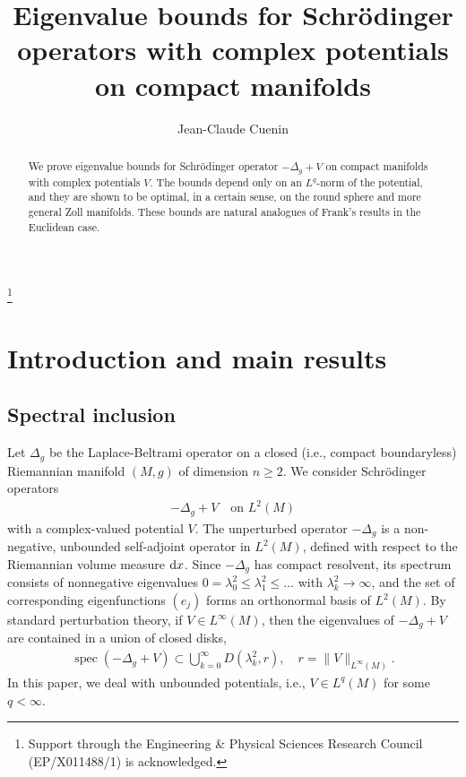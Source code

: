 \documentclass[12pt]{amsart}
\newcommand{\rd}{{\rm d}}
\DeclareMathOperator{\spec}{spec}
\begin{document}
\title[Eigenvalue bounds on compact manifolds]{Eigenvalue bounds for {S}chr\"{o}dinger operators with complex potentials on compact manifolds}

 \author{Jean-Claude Cuenin}
 \address{Department of Mathematical Sciences, Loughborough University, Loughborough,
 Leicestershire, LE11 3TU United Kingdom}
 
 \date{}
 \thanks{Support through the Engineering \& Physical Sciences Research Council (EP/X011488/1) is acknowledged.}

\begin{abstract}
We prove eigenvalue bounds for Schr\"odinger operator $-\Delta_g+V$ on compact manifolds with complex potentials $V$. The bounds depend only on an $L^q$-norm of the potential, and they are shown to be optimal, in a certain sense, on the round sphere and more general Zoll manifolds. These bounds are natural analogues of Frank's \cite{MR2820160} results in the Euclidean case.
\end{abstract}
\maketitle




\section{Introduction and main results}
\subsection{Spectral inclusion} Let $\Delta_g$ be the Laplace-Beltrami operator on a closed (i.e., compact boundaryless) Riemannian manifold $(M,g)$ of dimension $n\geq 2$.
We consider Schrödinger operators 
\begin{align}\label{Schrödinger operator on M}
    -\Delta_g+V \quad \mbox{on } L^2(M)
\end{align}
 with a complex-valued potential $V$. The unperturbed operator $-\Delta_g$ is a 
non-negative, unbounded self-adjoint operator in $L^2(M)$, defined with respect to the Riemannian volume measure $\rd x$. Since $-\Delta_g$ has compact resolvent, its spectrum consists of nonnegative eigenvalues $0=\lambda_0^2\leq \lambda_1^2\leq \ldots$ with $\lambda_k^2\to\infty$, and the set of corresponding eigenfunctions $(e_j)$ forms an orthonormal basis of $L^2(M)$. 
By standard perturbation theory, if $V\in L^{\infty}(M)$, then the eigenvalues of $-\Delta_g+V$ are contained in a union of closed disks, 
\begin{align}\label{Linfty bound}
\spec(-\Delta_g+V)\subset \bigcup_{k=0}^{\infty}D(\lambda_k^2,r), \quad r=\|V\|_{L^{\infty}(M)}.
\end{align}
 In this paper, we deal with unbounded potentials, i.e., $V\in L^q(M)$ for some $q<\infty$. 
\end{document}
